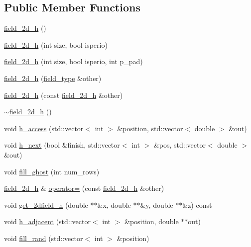 \subsection*{Public Member Functions}
\begin{DoxyCompactItemize}
\item 
\hyperlink{classfield__2d__h_ab6df2859fe41bbb6f756e36bc3af9df1}{field\+\_\+2d\+\_\+h} ()
\item 
\hyperlink{classfield__2d__h_af181b94fc627c791b50d62e859aec52e}{field\+\_\+2d\+\_\+h} (int size, bool isperio)
\item 
\hyperlink{classfield__2d__h_a9a3c09f4ccb61e0d5e425588ed5604db}{field\+\_\+2d\+\_\+h} (int size, bool isperio, int p\+\_\+pad)
\item 
\hyperlink{classfield__2d__h_a4473565aacf919cb23929f85c776a9f3}{field\+\_\+2d\+\_\+h} (\hyperlink{classfield__type}{field\+\_\+type} \&other)
\item 
\hyperlink{classfield__2d__h_ae819170893baf55b926e81babbfd44bb}{field\+\_\+2d\+\_\+h} (const \hyperlink{classfield__2d__h}{field\+\_\+2d\+\_\+h} \&other)
\item 
\hyperlink{classfield__2d__h_ab3590bf885419149040f15c42fd9065d}{$\sim$field\+\_\+2d\+\_\+h} ()
\item 
void \hyperlink{classfield__2d__h_a48d8cd8baa2fb122428a949b6fef0be4}{h\+\_\+access} (std\+::vector$<$ int $>$ \&position, std\+::vector$<$ double $>$ \&out)
\item 
void \hyperlink{classfield__2d__h_aaad4e607d26bff240f87dc81b5b8139c}{h\+\_\+next} (bool \&finish, std\+::vector$<$ int $>$ \&pos, std\+::vector$<$ double $>$ \&out)
\item 
void \hyperlink{classfield__2d__h_a94fe388174d778328629ad3fb4c13566}{fill\+\_\+ghost} (int num\+\_\+rows)
\item 
\hyperlink{classfield__2d__h}{field\+\_\+2d\+\_\+h} \& \hyperlink{classfield__2d__h_acc8c8dc7a57734eb984d29a55608adf6}{operator=} (const \hyperlink{classfield__2d__h}{field\+\_\+2d\+\_\+h} \&other)
\item 
void \hyperlink{classfield__2d__h_a595cdddce98f5d61467606f824b4939e}{get\+\_\+2dfield\+\_\+h} (double $\ast$$\ast$\&x, double $\ast$$\ast$\&y, double $\ast$$\ast$\&z) const 
\item 
void \hyperlink{classfield__2d__h_a450df16021eea9c91f7ddab116f69ef7}{h\+\_\+adjacent} (std\+::vector$<$ int $>$ \&position, double $\ast$$\ast$out)
\item 
void \hyperlink{classfield__2d__h_a3a4c57fdf1ce84f4e6006bb37a76ec58}{fill\+\_\+rand} (std\+::vector$<$ int $>$ \&position)

\end{DoxyCompactItemize}
